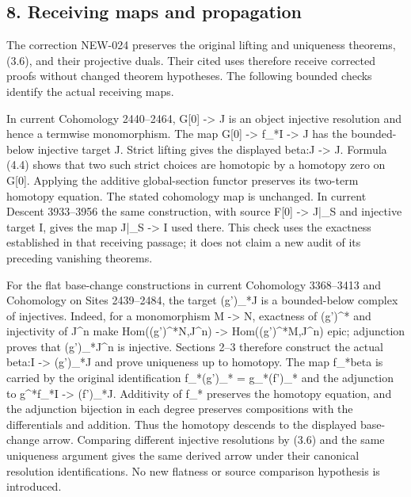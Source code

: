 \subsection{8. Receiving maps and propagation}\label{proofs-6209-7089-receiving-maps-and-propagation}

The correction NEW-024 preserves the original lifting and uniqueness theorems,\allowbreak{} (3.6)\allowbreak{},\allowbreak{} and their projective duals. Their cited uses therefore receive corrected proofs without changed theorem hypotheses. The following bounded checks identify the actual receiving maps.

In current Cohomology 2440–\allowbreak{}2464,\allowbreak{} G[0]\allowbreak{} \allowbreak{}-> J is an object injective resolution and hence a termwise monomorphism. The map G[0]\allowbreak{} \allowbreak{}-> f\_\allowbreak{}*I \allowbreak{}-> J\textquotesingle{} has the bounded-below injective target J\textquotesingle. Strict lifting gives the displayed beta:\allowbreak{}J \allowbreak{}-> J\textquotesingle. Formula (4.4)\allowbreak{} shows that two such strict choices are homotopic by a homotopy zero on G[0]\allowbreak{}. Applying the additive global-section functor preserves its two-term homotopy equation. The stated cohomology map is unchanged. In current Descent 3933–\allowbreak{}3956 the same construction,\allowbreak{} with source F[0]\allowbreak{} \allowbreak{}-> J|\_\allowbreak{}S and injective target I,\allowbreak{} gives the map J|\_\allowbreak{}S \allowbreak{}-> I used there. This check uses the exactness established in that receiving passage; it does not claim a new audit of its preceding vanishing theorems.

For the flat base-change constructions in current Cohomology 3368–\allowbreak{}3413 and Cohomology on Sites 2439–\allowbreak{}2484,\allowbreak{} the target (g')\allowbreak{}\_\allowbreak{}*J is a bounded-below complex of injectives. Indeed,\allowbreak{} for a monomorphism M \allowbreak{}-> N,\allowbreak{} exactness of (g')\allowbreak{}\textasciicircum{}* and injectivity of J\^{}n make Hom((g')\allowbreak{}\textasciicircum{}*N,\allowbreak{}J\textasciicircum{}n)\allowbreak{} \allowbreak{}-> Hom((g')\allowbreak{}\textasciicircum{}*M,\allowbreak{}J\textasciicircum{}n)\allowbreak{} epic; adjunction proves that (g')\allowbreak{}\_\allowbreak{}*J\textasciicircum{}n is injective. Sections 2–\allowbreak{}3 therefore construct the actual beta:\allowbreak{}I \allowbreak{}-> (g')\allowbreak{}\_\allowbreak{}*J and prove uniqueness up to homotopy. The map f\_\allowbreak{}*beta is carried by the original identification f\_\allowbreak{}*(g')\allowbreak{}\_\allowbreak{}* \allowbreak{}= g\_\allowbreak{}*(f')\allowbreak{}\_\allowbreak{}* and the adjunction to g\textasciicircum{}*f\_\allowbreak{}*I \allowbreak{}-> (f')\allowbreak{}\_\allowbreak{}*J. Additivity of f\_\allowbreak{}* preserves the homotopy equation,\allowbreak{} and the adjunction bijection in each degree preserves compositions with the differentials and addition. Thus the homotopy descends to the displayed base-change arrow. Comparing different injective resolutions by (3.6)\allowbreak{} and the same uniqueness argument gives the same derived arrow under their canonical resolution identifications. No new flatness or source comparison hypothesis is introduced.

